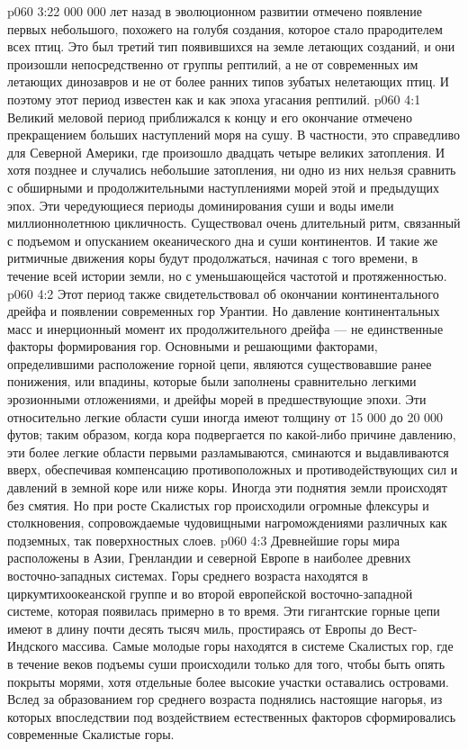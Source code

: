 \vs p060 3:22  000 000 лет назад в эволюционном развитии отмечено  появление первых  небольшого, похожего на голубя создания, которое стало прародителем всех птиц. Это был третий тип появившихся на земле летающих созданий, и они произошли непосредственно от группы рептилий, а не от современных им летающих динозавров и не от более ранних типов зубатых нелетающих птиц. И поэтому этот период известен как  и как эпоха угасания рептилий.
\vs p060 4:1 Великий меловой период приближался к концу и его окончание отмечено прекращением больших наступлений моря на сушу. В частности, это справедливо для Северной Америки, где произошло двадцать четыре великих затопления. И хотя позднее и случались небольшие затопления, ни одно из них нельзя сравнить с обширными и продолжительными наступлениями морей этой и предыдущих эпох. Эти чередующиеся периоды доминирования суши и воды имели миллионнолетнюю цикличность. Существовал очень длительный ритм, связанный с подъемом и опусканием океанического дна и суши континентов. И такие же ритмичные движения коры будут продолжаться, начиная с того времени, в течение всей истории земли, но с уменьшающейся частотой и протяженностью.
\vs p060 4:2 Этот период также свидетельствовал об окончании континентального дрейфа и появлении современных гор Урантии. Но давление континентальных масс и инерционный момент их продолжительного дрейфа --- не единственные факторы формирования гор. Основными и решающими факторами, определившими расположение горной цепи, являются существовавшие ранее понижения, или впадины, которые были заполнены сравнительно легкими эрозионными отложениями, и дрейфы морей в предшествующие эпохи. Эти относительно легкие области суши иногда имеют толщину от 15 000 до 20 000 футов; таким образом, когда кора подвергается по какой\hyp{}либо причине давлению, эти более легкие области первыми разламываются, сминаются и выдавливаются вверх, обеспечивая компенсацию противоположных и противодействующих сил и давлений в земной коре или ниже коры. Иногда эти поднятия земли происходят без смятия. Но при росте Скалистых гор происходили огромные флексуры и столкновения, сопровождаемые чудовищными нагромождениями различных как подземных, так поверхностных слоев.
\vs p060 4:3 \pc Древнейшие горы мира расположены в Азии, Гренландии и северной Европе в наиболее древних восточно\hyp{}западных системах. Горы среднего возраста находятся в циркумтихоокеанской группе и во второй европейской восточно\hyp{}западной системе, которая появилась примерно в то время. Эти гигантские горные цепи имеют в длину почти десять тысяч миль, простираясь от Европы до Вест\hyp{}Индского массива. Самые молодые горы находятся в системе Скалистых гор, где в течение веков подъемы суши происходили только для того, чтобы быть опять покрыты морями, хотя отдельные более высокие участки оставались островами. Вслед за образованием гор среднего возраста поднялись настоящие нагорья, из которых впоследствии под воздействием естественных факторов сформировались современные Скалистые горы.
